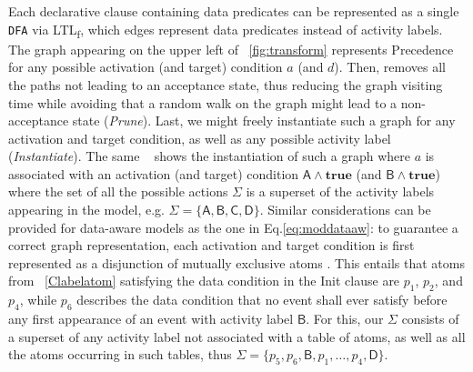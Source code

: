 \documentclass[acmengage]{acmart}
\newcommand{\LTLf}{\textup{LTL}\textsubscript{f}\xspace}
\begin{document}
Each declarative clause containing data predicates can be represented as a single \texttt{DFA} via \LTLf \cite{FLLOAT1,ltlfnfa}, which edges represent data predicates instead of activity labels. The graph appearing on the upper left of \figurename~\ref{fig:transform} represents \textsf{Precedence} for any possible activation (and target) condition $a$ (and $d$). Then, \cite{DBLP:conf/caise/CiccioBCM15} removes  all the paths not leading to an acceptance state, thus reducing the graph visiting time while avoiding that a random walk on the graph might lead to a non-acceptance state (\textit{Prune}). Last, we might freely instantiate such a graph for any activation and target condition, as well as any possible activity label \cite{DBLP:conf/bpm/BergamiMMM21} (\textit{Instantiate}). The same \figurename~ shows the instantiation of such a graph where $a$ is associated with an activation (and target) condition $\textsf{A}\wedge\mathbf{true}$ (and $\textsf{B}\wedge\mathbf{true}$) where the set of all the possible actions $\Sigma$ is a superset of the activity labels appearing in the model, e.g. $\Sigma=\{\textsf{A},\textsf{B},\textsf{C},\textsf{D}\}$. Similar considerations can be provided for data-aware models as the one in Eq.\ref{eq:moddataaw}:  to guarantee a correct graph representation,  each activation and target condition is first represented as a disjunction of mutually exclusive atoms %
 \cite{info14030173}. This entails that atoms from \figurename~\ref{Clabelatom} satisfying the data condition in the \textsf{Init} clause are $p_1$, $p_2$, and $p_4$, while $p_6$ describes the data condition that no event shall ever satisfy before any first appearance of an event with activity label $\textsf{B}$. For this, our %
$\Sigma$ 
consists of a superset of any activity label not associated with a table of atoms, as well as all the atoms occurring in such tables, thus $\Sigma=\{p_5,p_6,\textsf{B},p_1,\dots,p_4,\textsf{D}\}$.
\end{document}

